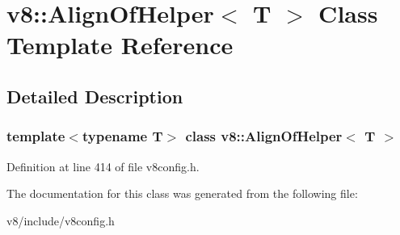 \hypertarget{classv8_1_1AlignOfHelper}{}\section{v8\+:\+:Align\+Of\+Helper$<$ T $>$ Class Template Reference}
\label{classv8_1_1AlignOfHelper}


\subsection{Detailed Description}
\subsubsection*{template$<$typename T$>$\newline
class v8\+::\+Align\+Of\+Helper$<$ T $>$}



Definition at line 414 of file v8config.\+h.



The documentation for this class was generated from the following file\+:\begin{DoxyCompactItemize}
\item 
v8/include/v8config.\+h\end{DoxyCompactItemize}
